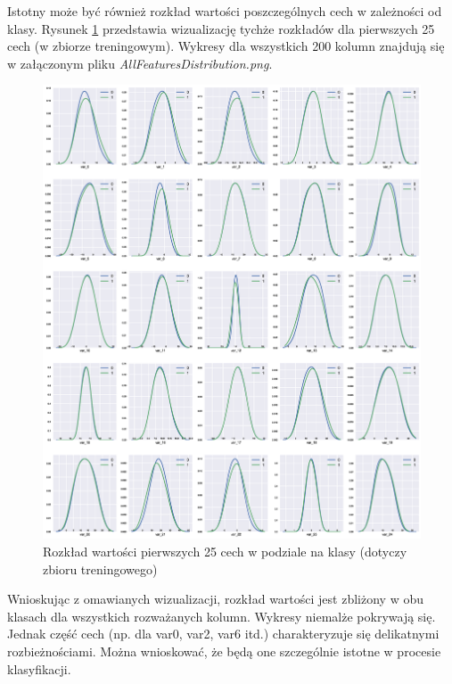 ﻿\documentclass[12pt]{article}
\begin{document}
Istotny może być również rozkład wartości poszczególnych cech w zależności od klasy.
Rysunek \ref{featuresDistribution25} przedstawia wizualizację tychże rozkładów dla pierwszych 25 cech (w zbiorze treningowym). Wykresy dla wszystkich 200 kolumn znajdują się w załączonym pliku \textit{AllFeaturesDistribution.png}.

\begin{figure}[H]
\centering 
\includegraphics[width = 472pt]{feature_distribution.eps}
\caption{Rozkład wartości pierwszych 25 cech w podziale na klasy (dotyczy zbioru treningowego)}
\label{featuresDistribution25}
\end{figure}

Wnioskując z omawianych wizualizacji, rozkład wartości jest zbliżony w obu klasach dla wszystkich rozważanych kolumn. Wykresy niemalże pokrywają się. Jednak część cech (np. dla var0, var2, var6 itd.) charakteryzuje się delikatnymi rozbieżnościami. Można wnioskować, że będą one szczególnie istotne w procesie klasyfikacji.
\end{document}

